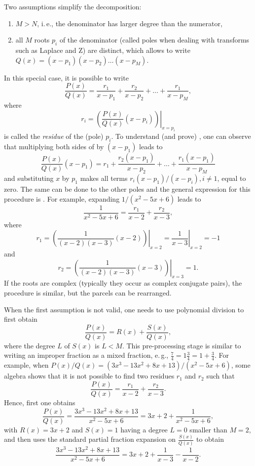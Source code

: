 Two assumptions simplify the decomposition:
\begin{enumerate}
	\item $M>N$, i.\,e., the denominator has larger degree than the numerator,
	\item all $M$ roots $p_i$ of the denominator (called poles when dealing with transforms such as Laplace and Z) are distinct, which allows to write $Q(x)=(x-p_1) (x-p_2) \ldots (x-p_M)$.
\end{enumerate}
In this special case, it is possible to write
\begin{equation}
\frac{P(x)}{Q(x)} = \frac{r_1}{x-p_1} + \frac{r_2}{x-p_2} + \ldots + \frac{r_1}{x-p_M},
\label{eq:fraction_expansion}
\end{equation}
where 
\begin{equation}
r_i = \left. \left( \frac{P(x)}{Q(x)}(x-p_i) \right) \right|_{x=p_i}
\label{eq:residue}
\end{equation}
is called the \emph{residue} of the (pole) $p_i$. To understand (and prove) , one can observe that multiplying both sides of  by $(x-p_1)$ leads to
\[
\frac{P(x)}{Q(x)} (x-p_1)= r_1 + \frac{r_2(x-p_1)}{x-p_2} + \ldots + \frac{r_1(x-p_1)}{x-p_M}
\]
and substituting $x$ by $p_1$ makes all terms $r_i(x-p_1)/(x-p_i), i \ne 1$, equal to zero. The same can be done to the other poles and the general expression for this procedure is . For example, expanding $1/(x^2 - 5x + 6)$ leads to
\[
\frac{1}{x^2 - 5x + 6} = \frac{r_1}{x-2} + \frac{r_2}{x-3},
\]
where
\[
r_1 = \left. \left( \frac{1}{(x-2)(x-3)}(x-2) \right) \right|_{x=2} = \left. \frac{1}{x-3}\right|_{x=2} = -1
\]
and
\[
r_2 = \left. \left( \frac{1}{(x-2)(x-3)}(x-3) \right) \right|_{x=3} = 1.
\]
If the roots are complex (typically they occur as complex conjugate pairs), the procedure is similar, but the parcels can be rearranged.

When the first assumption is not valid, one needs to use polynomial division to first obtain
\[
\frac{P(x)}{Q(x)}  = R(x) + \frac{S(x)}{Q(x)},
\]
where the degree $L$ of $S(x)$ is $L<M$. 
This pre-processing stage is similar to writing an improper fraction as a mixed fraction, e.\,g., $\frac{7}{4} = 1 \frac{3}{4} = 1 + \frac{3}{4}$.
For example, when $P(x)/Q(x)=(3x^3 -13x^2+8x+13)/(x^2-5x+6)$, some algebra shows that it is not possible to find two residues $r_1$ and $r_2$ such that
\[
\frac{P(x)}{Q(x)} = \frac{r_1}{x-2} + \frac{r_2}{x-3}.
\]
Hence, first one obtains
\[
\frac{P(x)}{Q(x)}  =  \frac{3x^3-13x^2+8x+13}{x^2-5x+6} =  3x + 2 + \frac{1}{x^2-5x+6},
\]
with $R(x)=3x+2$ and $S(x)=1$ having a degree $L=0$ smaller than $M=2$, and then uses the standard partial fraction expansion on $\frac{S(x)}{Q(x)}$ to obtain
\[
\frac{3x^3-13x^2+8x+13}{x^2-5x+6} =  3x + 2 + \frac{1}{x-3} - \frac{1}{x-2}.
\]

